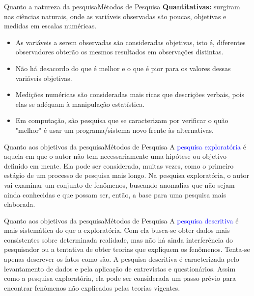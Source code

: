 \documentclass[t]{beamer}
\begin{document}
\begin{ftst}{Quanto a natureza da pesquisa}{Métodos de Pesquisa}
\vone
\justifying
\textbf{Quantitativas:} surgiram nas ciências naturais, onde as variáveis observadas são poucas, objetivas e medidas em escalas numéricas.
\vone
\begin{itemize}
    \item As variáveis a serem observadas são consideradas objetivas, isto é, diferentes observadores obterão os mesmos resultados em observações distintas.
    \item Não há desacordo do que é melhor e o que é pior para os valores dessas variáveis objetivas.
    \item Medições numéricas são consideradas mais ricas que descrições verbais, pois elas se adéquam à manipulação estatística.
    \item Em computação, são pesquisa que se caracterizam por verificar o quão "melhor" é usar um programa/sistema novo frente às alternativas.
\end{itemize}

\end{ftst}


\begin{ftst}{Quanto aos objetivos da pesquisa}{Métodos de Pesquisa}
\vone
\justifying
A \textcolor{blue}{pesquisa exploratória} é aquela em que o autor não tem necessariamente uma hipótese ou objetivo definido em mente. 
\vone
Ela pode ser considerada, muitas vezes, como o primeiro estágio de um processo de pesquisa mais longo. 
\vone
Na pesquisa exploratória, o autor vai examinar um conjunto de fenômenos, buscando anomalias que não sejam ainda conhecidas e que possam ser, então, a base para uma pesquisa mais elaborada.
\vone


\end{ftst}


\begin{ftst}{Quanto aos objetivos da pesquisa}{Métodos de Pesquisa}
\vone
\justifying
A \textcolor{blue}{pesquisa descritiva} é mais sistemática do que a exploratória. Com ela busca-se obter dados mais consistentes sobre determinada realidade, mas não há ainda interferência do pesquisador ou a tentativa de obter teorias que expliquem os fenômenos. 
\vone
Tenta-se apenas descrever os fatos como são.
\vone
A pesquisa descritiva é caracterizada pelo levantamento de dados e pela aplicação de entrevistas e questionários. 
\vone
Assim como a pesquisa exploratória, ela pode ser considerada um passo prévio para encontrar fenômenos não explicados pelas teorias vigentes.

\end{ftst}
\end{document}

